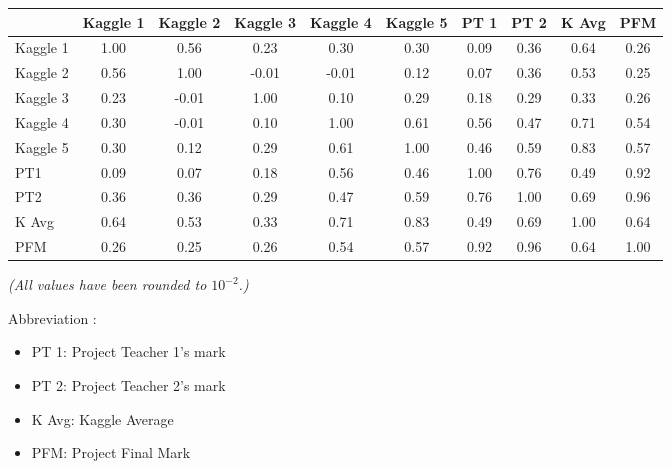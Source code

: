 \documentclass[a4paper]{article}
\begin{document}
	
	\begin{tabular}{|l|c|c|c|c|c|c|c|c|c|}
		\hline
		{} & Kaggle 1 & Kaggle 2 & Kaggle 3 & Kaggle 4 & Kaggle 5 & PT 1 & PT 2 & K Avg & PFM \\
		\hline
		Kaggle 1 & 1.00 & 0.56  & 0.23  & 0.30  & 0.30 & 0.09 & 0.36 & 0.64 & 0.26 \\
		Kaggle 2 & 0.56 & 1.00  & -0.01 & -0.01 & 0.12 & 0.07 & 0.36 & 0.53 & 0.25 \\
		Kaggle 3 & 0.23 & -0.01 & 1.00  & 0.10  & 0.29 & 0.18 & 0.29 & 0.33 & 0.26 \\
		Kaggle 4 & 0.30 & -0.01 & 0.10  & 1.00  & 0.61 & 0.56 & 0.47 & 0.71 & 0.54 \\
		Kaggle 5 & 0.30 & 0.12  & 0.29  & 0.61  & 1.00 & 0.46 & 0.59 & 0.83 & 0.57 \\
		PT1      & 0.09 & 0.07  & 0.18  & 0.56  & 0.46 & 1.00 & 0.76 & 0.49 & 0.92 \\
		PT2      & 0.36 & 0.36  & 0.29  & 0.47  & 0.59 & 0.76 & 1.00 & 0.69 & 0.96 \\
		K Avg    & 0.64 & 0.53  & 0.33  & 0.71  & 0.83 & 0.49 & 0.69 & 1.00 & 0.64 \\
		PFM      & 0.26 & 0.25  & 0.26  & 0.54  & 0.57 & 0.92 & 0.96 & 0.64 & 1.00 \\
		\hline
	\end{tabular}
	
	\vspace{0.1cm}
	\textit{(All values have been rounded to $10^{-2}$.)}

	\vspace{0.5cm}
	Abbreviation :
	\begin{itemize}
		\item PT 1: Project Teacher 1's mark
		\item PT 2: Project Teacher 2's mark
		\item K Avg: Kaggle Average
		\item PFM: Project Final Mark
	\end{itemize}
	
\end{document}

